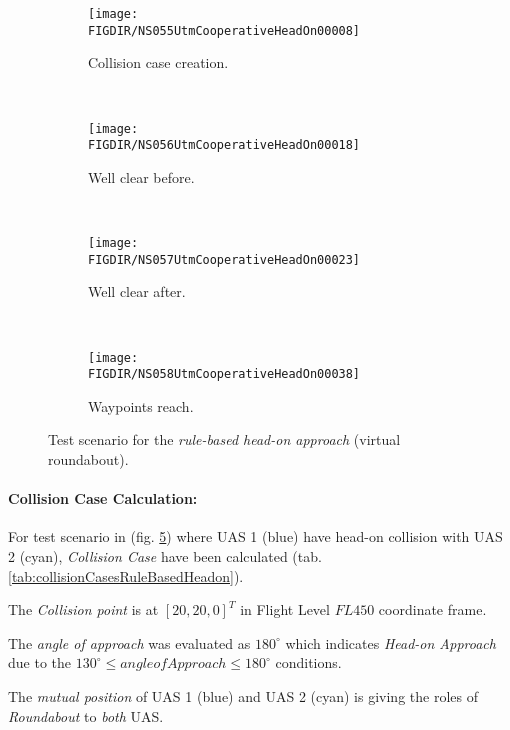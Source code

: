 \begin{figure}[H]
    \centering
    \begin{subfigure}{0.75\textwidth}
        \centering
        \texttt{[image: \\FIGDIR/NS055UtmCooperativeHeadOn00008]}
        \caption{Collision case creation.}
        \label{fig:ruleBasedHeadOnSituationCollisionCaseCreation}
    \end{subfigure}
    \\
    \begin{subfigure}{0.75\textwidth}
        \centering
        \texttt{[image: \\FIGDIR/NS056UtmCooperativeHeadOn00018]} 
        \caption{Well clear before.}
        \label{fig:ruleBasedHeadOnWellClearBefore}
    \end{subfigure}
    \\
    \begin{subfigure}{0.75\textwidth}
        \centering
        \texttt{[image: \\FIGDIR/NS057UtmCooperativeHeadOn00023]} 
        \caption{Well clear after.}
        \label{fig:ruleBasedHeadOnWellClearAfter}
    \end{subfigure}
    \\
    \begin{subfigure}{0.75\textwidth}
        \centering
        \texttt{[image: \\FIGDIR/NS058UtmCooperativeHeadOn00038]} 
        \caption{Waypoints reach.}
        \label{fig:ruleBasedHeadOnWaypointsReach}
    \end{subfigure}
    \caption{Test scenario for the \emph{rule-based head-on approach} (virtual roundabout). }
    \label{fig:testCaseRuleBasedHeadOnApproach}
\end{figure}

\paragraph{Collision Case Calculation: } For test scenario in (fig. \ref{fig:testCaseRuleBasedHeadOnApproach}) where UAS 1 (blue) have head-on collision with UAS 2 (cyan), \emph{Collision Case} have been calculated (tab. \ref{tab:collisionCasesRuleBasedHeadon}).

The \emph{Collision point} is at $[20,20,0]^T$ in Flight Level $FL450$ coordinate frame.

The \emph{angle of approach} was evaluated as $180^{\circ}$ which indicates \emph{Head-on Approach} due to the $130^\circ \le angle of Approach \le 180^\circ$ conditions.

The \emph{mutual position} of UAS 1 (blue) and UAS 2 (cyan) is giving the roles of \emph{Roundabout} to \emph{both} UAS.

